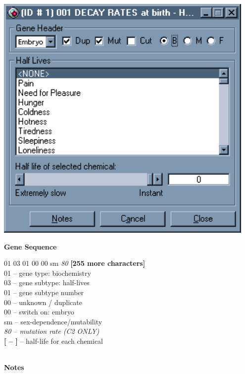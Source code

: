 \documentclass[11pt,twoside,a4paper]{article}
\begin{document}
\begin{minipage}[ht]{0.40\textwidth}
	\includegraphics[width=0.95\textwidth]{img/gen13k.png}
\end{minipage} \hfill \begin{minipage}[ht]{0.575\textwidth}
	\textbf{\large Gene Sequence} %

	01 03 01 00 00 sm \emph{80} \textbf{[255 more characters]} ~\\

	01 -- gene type: biochemistry ~\\
	03 -- gene subtype: half-lives ~\\
	01 -- gene subtype number ~\\
	00 -- unknown / duplicate ~\\
	00 -- switch on: embryo ~\\
	sm -- sex-dependence/mutability ~\\
	\emph{80 -- mutation rate (C2 ONLY)} ~\\
	\textbf{[ -- ]} -- half-life for each chemical ~\\
\end{minipage} ~\\

\textbf{\large Notes}

\end{document}
